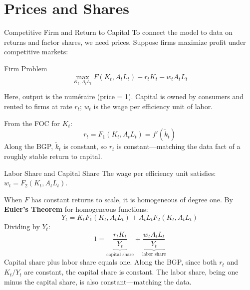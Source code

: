 \documentclass[aspectratio=169,10pt]{beamer}
\newcommand{\apxbutton}[1]{\hfill\hyperlink{#1}{\beamerbutton{Appendix}}}
\begin{document}
\section{Prices and Shares}

\begin{frame}{Competitive Firm and Return to Capital}
\hypertarget{m-a10}{}
To connect the model to data on returns and factor shares, we need prices. Suppose firms maximize profit under competitive markets:
\begin{block}{Firm Problem}
\[
\max_{K_t,A_tL_t} F(K_t,A_tL_t)-r_tK_t-w_tA_tL_t \tag{3.9}
\]
\end{block}
Here, output is the num\'{e}raire (price = 1). Capital is owned by consumers and rented to firms at rate $r_t$; $w_t$ is the wage per efficiency unit of labor.

\medskip
From the FOC for $K_t$:
\[
r_t = F_1(K_t,A_tL_t) = f'(\tilde{k}_t)
\]
Along the BGP, $\tilde{k}_t$ is constant, so $r_t$ is constant---matching the data fact of a roughly stable return to capital.
\apxbutton{a10}
\end{frame}

\begin{frame}{Labor Share and Capital Share}
\hypertarget{m-a11}{}
The wage per efficiency unit satisfies: $w_t = F_2(K_t,A_tL_t)$.

\medskip
When $F$ has constant returns to scale, it is homogeneous of degree one. By \textbf{Euler's Theorem} for homogeneous functions:
\[
Y_t = K_t F_1(K_t,A_tL_t) + A_tL_t F_2(K_t,A_tL_t)
\]
Dividing by $Y_t$:
\[
1 = \underbrace{\frac{r_t K_t}{Y_t}}_{\text{capital share}} + \underbrace{\frac{w_t A_t L_t}{Y_t}}_{\text{labor share}}
\]
Capital share plus labor share equals one. Along the BGP, since both $r_t$ and $K_t/Y_t$ are constant, the capital share is constant. The labor share, being one minus the capital share, is also constant---matching the data.
\apxbutton{a11}
\end{frame}
\end{document}

